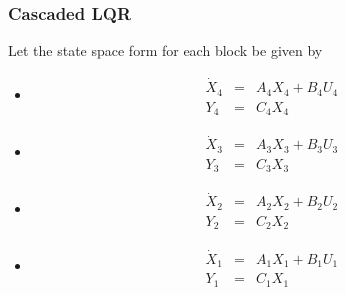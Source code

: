 \documentclass[10pt]{beamer}
\begin{document}
\begin{frame}
\frametitle{Cascaded LQR}
Let the state space form for each block be given by
\begin{itemize}
 \item
 \begin{eqnarray}
\dot X_4&=&A_4 X_4+B_4 U_4\\\nonumber
Y_4&=&C_4 X_4\label{RollAPclqr11a}
\end{eqnarray}
  \item
  \begin{eqnarray}
\dot X_3&=&A_3 X_3+B_3 U_3\\\nonumber
Y_3&=&C_3 X_3\label{RollAPclqr12a}
\end{eqnarray}
 \item
 \begin{eqnarray}
\dot X_2&=&A_2 X_2+B_2 U_2\\\nonumber
Y_2&=&C_2 X_2\label{RollAPclqr13a}
\end{eqnarray}
 \item
 \begin{eqnarray}
\dot X_1&=&A_1 X_1+B_1 U_1\\\nonumber
Y_1&=&C_1 X_1\label{RollAPclqr13b}
\end{eqnarray}
\end{itemize}

\vspace{.4cm}
\end{frame}
%
\end{document}
